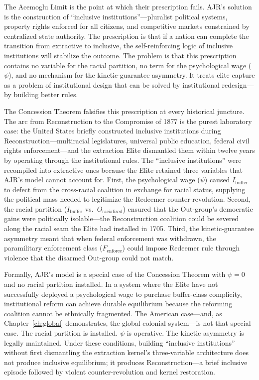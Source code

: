 The Acemoglu Limit is the point at which their prescription fails. AJR's solution is the construction of ``inclusive institutions''---pluralist political systems, property rights enforced for all citizens, and competitive markets constrained by centralized state authority. The prescription is that if a nation can complete the transition from extractive to inclusive, the self-reinforcing logic of inclusive institutions will stabilize the outcome. The problem is that this prescription contains no variable for the racial partition, no term for the psychological wage ($\psi$), and no mechanism for the kinetic-guarantee asymmetry. It treats elite capture as a problem of institutional design that can be solved by institutional redesign---by building better rules.

The Concession Theorem falsifies this prescription at every historical juncture. The arc from Reconstruction to the Compromise of 1877 is the purest laboratory case: the United States briefly constructed inclusive institutions during Reconstruction---multiracial legislatures, universal public education, federal civil rights enforcement---and the extraction Elite dismantled them within twelve years by operating through the institutional rules. The ``inclusive institutions'' were recompiled into extractive ones because the Elite retained three variables that AJR's model cannot account for. First, the psychological wage ($\psi$) caused $I_{\text{buffer}}$ to defect from the cross-racial coalition in exchange for racial status, supplying the political mass needed to legitimize the Redeemer counter-revolution. Second, the racial partition ($I_{\text{buffer}}$ vs.\ $O_{\text{racialized}}$) ensured that the Out-group's democratic gains were politically isolable---the Reconstruction coalition could be severed along the racial seam the Elite had installed in 1705. Third, the kinetic-guarantee asymmetry meant that when federal enforcement was withdrawn, the paramilitary enforcement class ($F_{\text{enforce}}$) could impose Redeemer rule through violence that the disarmed Out-group could not match.

Formally, AJR's model is a special case of the Concession Theorem with $\psi = 0$ and no racial partition installed. In a system where the Elite have not successfully deployed a psychological wage to purchase buffer-class complicity, institutional reform can achieve durable equilibrium because the reforming coalition cannot be ethnically fragmented. The American case---and, as Chapter~\ref{ch:global} demonstrates, the global colonial system---is not that special case. The racial partition is installed. $\psi$ is operative. The kinetic asymmetry is legally maintained. Under these conditions, building ``inclusive institutions'' without first dismantling the extraction kernel's three-variable architecture does not produce inclusive equilibrium; it produces Reconstruction---a brief inclusive episode followed by violent counter-revolution and kernel restoration.

